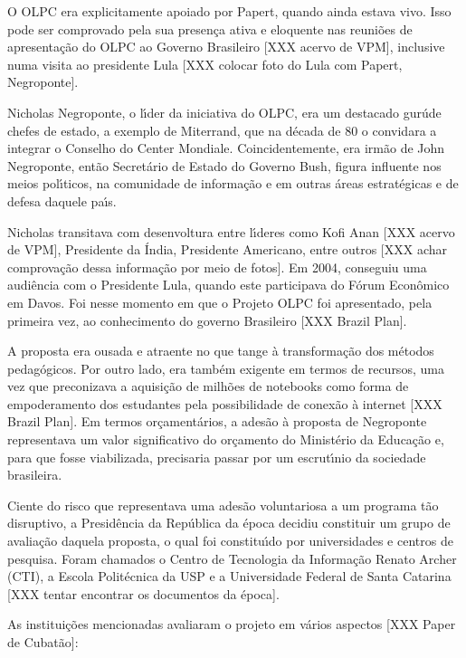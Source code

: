 \documentclass[
12pt,		%
openright,	%
twoside,  %
a4paper,			%
chapter=TITLE,		%
english,			%
french,				%
spanish,			%
brazil				%
]{USPSC-classe/USPSC}
\begin{document}
O OLPC era explicitamente apoiado por Papert, quando ainda estava vivo. Isso pode ser comprovado pela sua presen\c{c}a ativa e eloquente nas reuni\~oes de apresenta\c{c}\~ao do OLPC ao Governo Brasileiro [XXX acervo de VPM], inclusive numa visita ao presidente Lula [XXX colocar foto do Lula com Papert, Negroponte].


Nicholas Negroponte, o l\'{\i}der da iniciativa do OLPC, era um destacado \textquotedbl gur\'u\textquotedbl  de chefes de estado, a exemplo de Miterrand, que na d\'ecada de 80 o convidara a integrar o Conselho do \textquotedbl Center Mondiale. Coincidentemente, era irm\~ao de John Negroponte, ent\~ao Secret\'ario de Estado do Governo Bush, figura influente nos meios pol\'{\i}ticos, na comunidade de informa\c{c}\~ao e em outras \'areas estrat\'egicas e de defesa daquele pa\'{\i}s.


Nicholas transitava com desenvoltura entre l\'{\i}deres como Kofi Anan [XXX acervo de VPM], Presidente da \'India, Presidente Americano, entre outros [XXX achar comprova\c{c}\~ao dessa informa\c{c}\~ao por meio de fotos]. Em 2004, conseguiu uma audi\^encia com o Presidente Lula, quando este participava do F\'orum  Econ\^omico  em Davos. Foi nesse momento em que o Projeto OLPC foi apresentado, pela primeira vez, ao conhecimento do governo Brasileiro [XXX Brazil Plan].


A proposta era ousada e atraente no que tange \`a transforma\c{c}\~ao dos m\'etodos pedag\'ogicos. Por outro lado, era tamb\'em exigente em termos de recursos, uma vez que preconizava a aquisi\c{c}\~ao de milh\~oes de notebooks como forma de empoderamento dos estudantes pela possibilidade de conex\~ao \`a internet [XXX Brazil Plan]. Em termos or\c{c}ament\'arios, a ades\~ao \`a proposta de Negroponte representava um valor significativo do or\c{c}amento do Minist\'erio da Educa\c{c}\~ao e, para que fosse viabilizada, precisaria passar por um escrut\'{\i}nio da sociedade brasileira.


Ciente do risco que representava uma ades\~ao voluntariosa a um programa t\~ao disruptivo, a Presid\^encia da Rep\'ublica da \'epoca decidiu constituir um grupo de avalia\c{c}\~ao  daquela proposta, o  qual foi constitu\'{\i}do por universidades e centros de pesquisa. Foram chamados o Centro de Tecnologia da Informa\c{c}\~ao Renato Archer (CTI), a Escola Polit\'ecnica da USP e a Universidade Federal de Santa Catarina [XXX tentar encontrar os documentos da \'epoca]. 


As institui\c{c}\~oes mencionadas avaliaram o projeto em v\'arios aspectos [XXX Paper de Cubat\~ao]:
\end{document}
